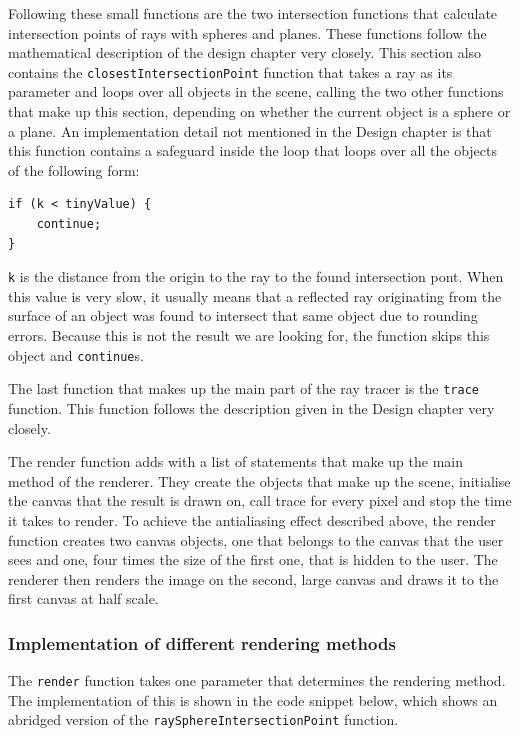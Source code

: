 \documentclass[11pt]{report}
\begin{document}
Following these small functions are the two intersection functions that calculate intersection points of rays with spheres and planes. These functions follow the mathematical description of the design chapter very closely. This section also contains the \texttt{closestIntersectionPoint} function that takes a ray as its parameter and loops over all objects in the scene, calling the two other functions that make up this section, depending on whether the current object is a sphere or a plane. An implementation detail not mentioned in the Design chapter is that this function contains a safeguard inside the loop that loops over all the objects of the following form:

\begin{lstlisting}
if (k < tinyValue) {
    continue;
}
\end{lstlisting}

\texttt{k} is the distance from the origin to the ray to the found intersection pont. When this value is very slow, it usually means that a reflected ray originating from the surface of an object was found to intersect that same object due to rounding errors. Because this is not the result we are looking for, the function skips this object and \texttt{continue}s.

The last function that makes up the main part of the ray tracer is the \texttt{trace} function. This function follows the description given in the Design chapter very closely.

The render function adds with a list of statements that make up the main method of the renderer. They create the objects that make up the scene, initialise the canvas that the result is drawn on, call trace for every pixel and stop the time it takes to render. To achieve the antialiasing effect described above, the render function creates two canvas objects, one that belongs to the canvas that the user sees and one, four times the size of the first one, that is hidden to the user. The renderer then renders the image on the second, large canvas and draws it to the first canvas at half scale. 

\subsubsection{Implementation of different rendering methods}

The \texttt{render} function takes one parameter that determines the rendering method. The implementation of this is shown in the code snippet below, which shows an abridged version of the \texttt{raySphereIntersectionPoint} function.
\end{document}
